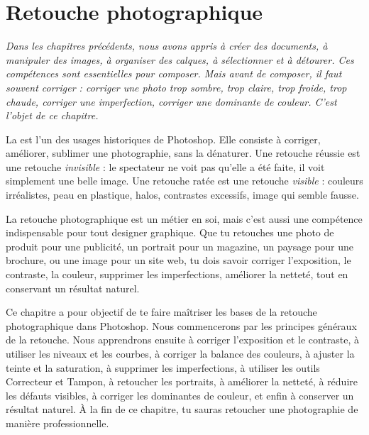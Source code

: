 
\chapter{Retouche photographique}

\noindent
\textit{Dans les chapitres précédents, nous avons appris à créer des documents, à manipuler des images, à organiser des calques, à sélectionner et à détourer. Ces compétences sont essentielles pour composer. Mais avant de composer, il faut souvent \emph{corriger} : corriger une photo trop sombre, trop claire, trop froide, trop chaude, corriger une imperfection, corriger une dominante de couleur. C'est l'objet de ce chapitre.}

\vspace{1em}

\noindent
La  est l'un des usages historiques de Photoshop. Elle consiste à corriger, améliorer, sublimer une photographie, sans la dénaturer. Une retouche réussie est une retouche \emph{invisible} : le spectateur ne voit pas qu'elle a été faite, il voit simplement une belle image. Une retouche ratée est une retouche \emph{visible} : couleurs irréalistes, peau en plastique, halos, contrastes excessifs, image qui semble fausse.

\vspace{1em}

\noindent
La retouche photographique est un métier en soi, mais c'est aussi une compétence indispensable pour tout designer graphique. Que tu retouches une photo de produit pour une publicité, un portrait pour un magazine, un paysage pour une brochure, ou une image pour un site web, tu dois savoir corriger l'exposition, le contraste, la couleur, supprimer les imperfections, améliorer la netteté, tout en conservant un résultat naturel.

\vspace{1em}

\noindent
Ce chapitre a pour objectif de te faire maîtriser les bases de la retouche photographique dans Photoshop. Nous commencerons par les principes généraux de la retouche. Nous apprendrons ensuite à corriger l'exposition et le contraste, à utiliser les niveaux et les courbes, à corriger la balance des couleurs, à ajuster la teinte et la saturation, à supprimer les imperfections, à utiliser les outils Correcteur et Tampon, à retoucher les portraits, à améliorer la netteté, à réduire les défauts visibles, à corriger les dominantes de couleur, et enfin à conserver un résultat naturel. À la fin de ce chapitre, tu sauras retoucher une photographie de manière professionnelle.

